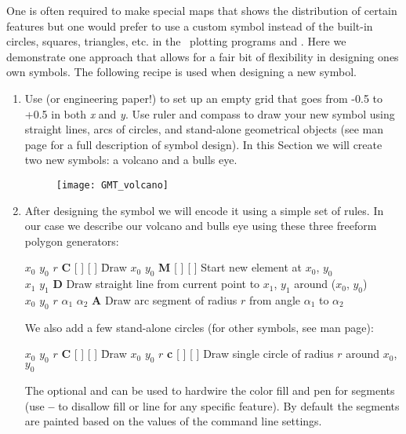 One is often required to make special maps that shows the
distribution of certain features but one would prefer to
use a custom symbol instead of the built-in circles,
squares, triangles, etc. in the \GMT\ plotting programs
 and .  Here we demonstrate one
approach that allows for a fair bit of flexibility in
designing ones own symbols.  The following recipe is used
when designing a new symbol.
\begin{enumerate}
\item Use  (or
engineering paper!) to set up an empty grid that goes from
-0.5 to +0.5 in both {\it x} and {\it y}.  Use ruler and
compass to draw your new symbol using straight lines,
arcs of circles, and stand-alone geometrical objects (see  man page for
a full description of symbol design).  In this Section we will create two new symbols:
a volcano and a bulls eye.

\begin{figure}[ht]
   \centering\texttt{[image: GMT\_volcano]}
\end{figure}

\item After designing the symbol we will encode it using a
simple set of rules.  In our case we describe our volcano and bulls eye
using these three freeform polygon generators:

\begin{tabbing} 
$x_0$ $y_0$ $r$ {\bf C} [  ] [  ] \=Draw \kill
$x_0$ $y_0$ {\bf M} [  ] [  ] \> Start new element at $x_0$, $y_0$ \\ 
$x_1$ $y_1$ {\bf D} \> Draw straight line from current point to $x_1$, $y_1$ around ($x_0$, $y_0$) \\ 
$x_0$ $y_0$ $r$ $\alpha_1$ $\alpha_2$ {\bf A} \> Draw
arc segment of radius $r$ from angle $\alpha_1$ to $\alpha_2$
\end{tabbing} 

We also add a few stand-alone circles (for other symbols, see  man page):

\begin{tabbing} 
$x_0$ $y_0$ $r$ {\bf C} [  ] [  ] \=Draw \kill
$x_0$ $y_0$ $r$ {\bf c} [  ] [  ] \> Draw
single circle of radius $r$ around $x_0$, $y_0$ \\
\end{tabbing} 

The optional  and  can be used to hardwire
the color fill and pen for segments (use {\bf --} to disallow
fill or line for any specific feature).  By default the segments
are painted based on the values of the command line settings.


\end{enumerate}
